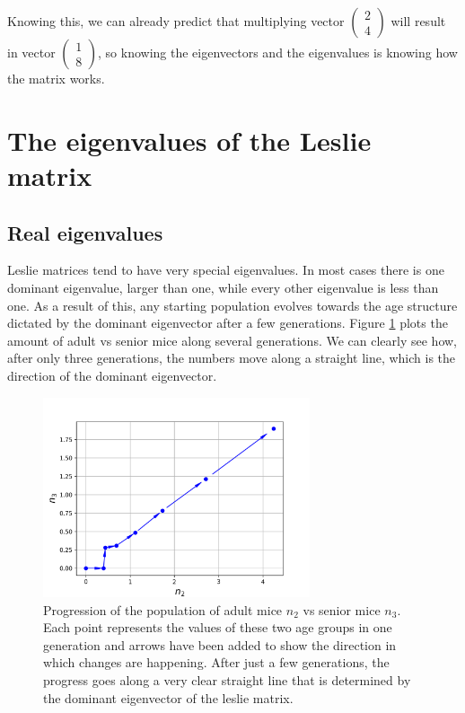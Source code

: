 \documentclass{tufte-book} %
\begin{document}
Knowing this, we can already predict that multiplying vector $\begin{pmatrix}  2\\ 4 \end{pmatrix}$ will result in vector  $\begin{pmatrix}  1\\ 8 \end{pmatrix}$, so knowing the eigenvectors and the eigenvalues is  knowing how the matrix works.
\section{The eigenvalues of the Leslie matrix}

\subsection{Real eigenvalues}
Leslie matrices tend to have very special eigenvalues. In most cases there is one dominant eigenvalue, larger than one, while every other eigenvalue is less than one. As a result of this, any starting population evolves towards the age structure dictated by the dominant eigenvector after a few generations. Figure \ref{fig:leslie_phase} plots the amount of adult vs senior mice along several generations. We can clearly see how, after only three generations, the numbers move along a straight line, which is the direction of the dominant eigenvector.

\begin{figure}
	\begin{center}
		\includegraphics[width=0.7\textwidth]{project_n2_n3}	
	\end{center}
	\caption{Progression of the population of adult mice $n_2$ vs senior mice $n_3$. Each point represents the values of these two age groups in one generation and arrows have been added to show the direction in which changes are happening. After just a few generations, the progress goes along a very clear straight line that is determined by the dominant eigenvector of the leslie matrix. }
	\label{fig:leslie_phase}
\end{figure}
\end{document}
